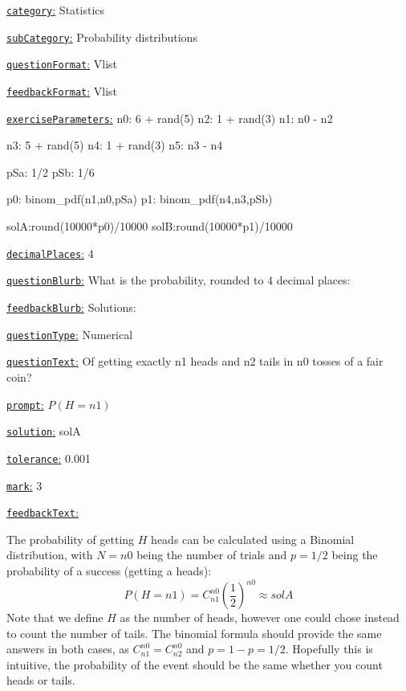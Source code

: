 \documentclass[preview]{standalone}
\newcommand \fieldname[1]{\underline{\texttt{#1}:}}
\begin{document}
\fieldname{category}  %
Statistics

\fieldname{subCategory} %
Probability distributions

\fieldname{questionFormat}
Vlist

\fieldname{feedbackFormat}
Vlist

\fieldname{exerciseParameters}
n0: 6 + rand(5)
n2: 1 + rand(3)
n1: n0 - n2

n3: 5 + rand(5)
n4: 1 + rand(3)
n5: n3 - n4

pSa: 1/2
pSb: 1/6

p0: binom_pdf(n1,n0,pSa)
p1: binom_pdf(n4,n3,pSb)

solA:round(10000*p0)/10000
solB:round(10000*p1)/10000

\fieldname{decimalPlaces}
4

\fieldname{questionBlurb}
What is the probability, rounded to 4 decimal places:

\fieldname{feedbackBlurb}
Solutions:

\fieldname{questionType}
Numerical

\fieldname{questionText}
Of getting exactly {n1} heads and {n2} tails in {n0} tosses of a fair coin?

\fieldname{prompt}
$P(H = {n1})$

\fieldname{solution}
solA

\fieldname{tolerance}
0.001

\fieldname{mark}
3

\fieldname{feedbackText}

The probability of getting $H$ heads can be calculated using a Binomial distribution, with $N={n0}$ being the number of trials and $p=1/2$ being the probability of a success (getting a heads):
\[
P(H = {n1})  = C^{{n0}}_{{n1}}  \left(\frac{1}{2}\right)^{{n0}} \approx {solA}
\]
Note that we define $H$ as the number of heads, however one could chose instead to count the number of tails. The binomial formula should provide the same answers in both cases, as $C^{{n0}}_{{n1}} = C^{{n0}}_{{n2}}$ and $p=1-p=1/2$. Hopefully this is intuitive, the probability of the event should be the same whether you count heads or tails.
\end{document}
